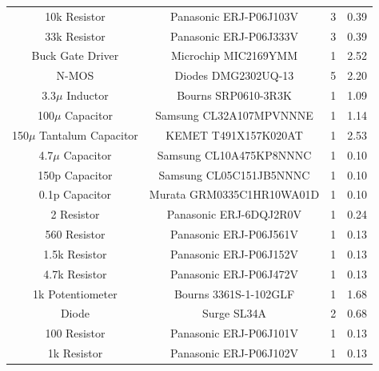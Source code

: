\documentclass[12pt]{article}
\begin{document}
\begin{table}[!h]
{\begin{tabular}{ |c|c|c|c| }
 		10k Resistor & Panasonic ERJ-P06J103V & 3 & 0.39 \\
 		33k Resistor & Panasonic ERJ-P06J333V & 3 & 0.39 \\
 		Buck Gate Driver & Microchip MIC2169YMM & 1 & 2.52 \\
 		N-MOS & Diodes DMG2302UQ-13 & 5 & 2.20 \\
 		3.3$\mu$ Inductor & Bourns SRP0610-3R3K & 1 & 1.09 \\
 		100$\mu$ Capacitor & Samsung CL32A107MPVNNNE & 1 & 1.14 \\
 		150$\mu$ Tantalum Capacitor & KEMET T491X157K020AT & 1 & 2.53 \\
 		4.7$\mu$ Capacitor & Samsung CL10A475KP8NNNC & 1 & 0.10 \\
 		150p Capacitor & Samsung CL05C151JB5NNNC & 1 & 0.10 \\
 		0.1p Capacitor & Murata GRM0335C1HR10WA01D & 1 & 0.10 \\
 		2 Resistor & Panasonic ERJ-6DQJ2R0V & 1 & 0.24 \\
 		560 Resistor & Panasonic ERJ-P06J561V & 1 & 0.13 \\
 		1.5k Resistor & Panasonic ERJ-P06J152V & 1 & 0.13 \\
 		4.7k Resistor & Panasonic ERJ-P06J472V & 1 & 0.13 \\
 		1k Potentiometer & Bourns 3361S-1-102GLF & 1 & 1.68 \\
 		Diode & Surge SL34A & 2 & 0.68 \\
 		100 Resistor & Panasonic ERJ-P06J101V & 1 & 0.13 \\
 		1k Resistor & Panasonic ERJ-P06J102V & 1 & 0.13 \\
 		\hline
	\end{tabular}
	}
\end{table}
\end{document}
